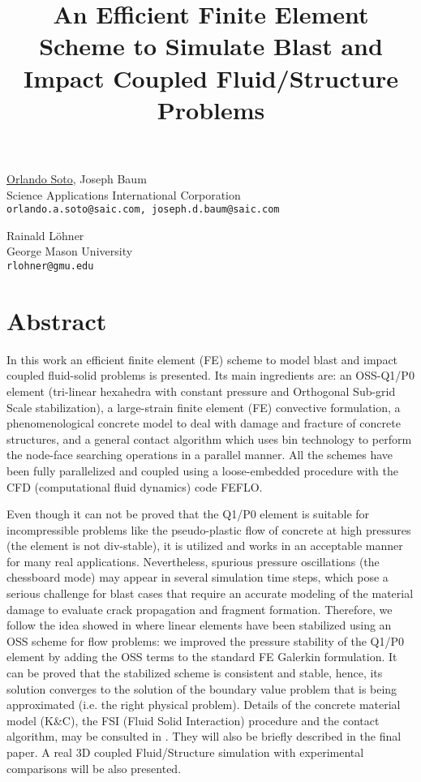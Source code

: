 \title{An Efficient Finite Element Scheme to Simulate Blast and Impact Coupled Fluid/Structure Problems}
\author{} \institute{}
\maketitle

\begin{center}
{\large \underline{Orlando Soto}, Joseph Baum}\\
Science Applications International Corporation\\
{\tt orlando.a.soto@saic.com, joseph.d.baum@saic.com}\\
\vspace{4mm}

{\large Rainald L\"ohner}\\
George Mason University\\
{\tt rlohner@gmu.edu}
\end{center}

\section*{Abstract}
In this work an efficient finite element (FE) scheme to model blast and impact coupled fluid-solid problems is presented. Its main ingredients are: an OSS-Q1/P0 element (tri-linear hexahedra with constant pressure and Orthogonal Sub-grid Scale stabilization), a large-strain finite  element (FE) convective formulation, a phenomenological concrete model to  deal with damage and fracture of concrete structures, and a general contact algorithm  which uses bin technology to perform the node-face searching operations in a parallel manner. All the schemes have been fully parallelized and coupled using a loose-embedded procedure with the CFD (computational fluid dynamics) code FEFLO.

Even though it can not be proved that the Q1/P0 element is suitable for incompressible problems like the pseudo-plastic flow of concrete at high pressures (the element is not div-stable), it is utilized and works in an acceptable manner for many real applications. Nevertheless, spurious pressure oscillations (the chessboard mode) may appear in several simulation time steps, which pose a serious challenge for blast cases that require an accurate modeling of the material damage to evaluate crack propagation and fragment formation. Therefore, we follow the idea showed in \cite{ref1} where linear elements have been stabilized using an OSS scheme
for flow problems: we improved the pressure stability of the Q1/P0  element by adding the OSS terms to the standard FE Galerkin formulation. It can be proved that the stabilized scheme is consistent and stable, hence, its solution converges to the solution of the boundary value problem that is being approximated (i.e. the right physical problem). Details of the concrete material model (K\&C), the FSI (Fluid Solid Interaction) procedure and the contact algorithm, may be consulted in \cite{ref3}. They will also be briefly described in the final paper. A real 3D coupled Fluid/Structure simulation with experimental comparisons will be also presented.

